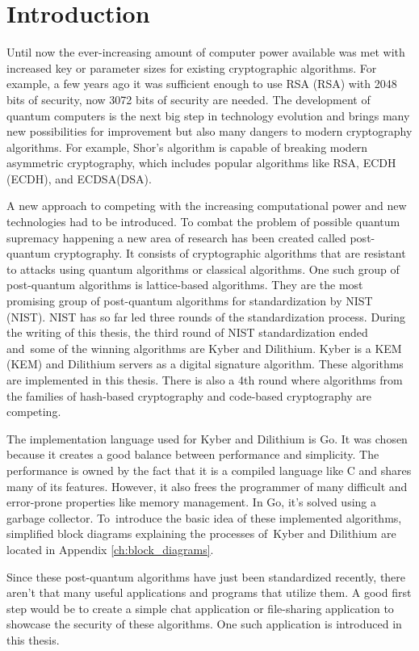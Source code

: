 \chapter*{Introduction}
{}

Until now the ever-increasing amount of computer power available was met with increased key or parameter sizes for existing cryptographic algorithms. For example, a few years ago it was sufficient enough to use RSA (\acl{RSA}) with 2048 bits of security, now 3072 bits of security are needed. The development of quantum computers is the next big step in technology evolution and brings many new possibilities for improvement but also many dangers to modern cryptography algorithms. For example, Shor's algorithm is capable of breaking modern asymmetric cryptography, which includes popular algorithms like RSA, ECDH (\acl{ECDH}), and ECDSA(\acl{DSA}).

A new approach to competing with the increasing computational power and new technologies had to be introduced. To combat the problem of possible quantum supremacy happening a new area of research has been created called post-quantum cryptography. It consists of cryptographic algorithms that are resistant to attacks using quantum algorithms or classical algorithms. One such group of post-quantum algorithms is lattice-based algorithms. They are the most promising group of post-quantum algorithms for standardization by NIST (\acl{NIST}). NIST has so far led three rounds of the standardization process. During the writing of this thesis, the third round of NIST standardization ended and~some of the winning algorithms are Kyber and Dilithium. Kyber is a KEM (\acl{KEM}) and Dilithium servers as a digital signature algorithm. These algorithms are implemented in this thesis. There is also a 4th round where algorithms from the families of hash-based cryptography and code-based cryptography are competing.

The implementation language used for Kyber and Dilithium is Go. It was chosen because it creates a good balance between performance and simplicity. The performance is owned by the fact that it is a compiled language like C and shares many of its features. However, it also frees the programmer of many difficult and error-prone properties like memory management. In Go, it's solved using a garbage collector. To~introduce the basic idea of these implemented algorithms, simplified block diagrams explaining the processes of~Kyber and Dilithium are located in Appendix \ref{ch:block_diagrams}.

Since these post-quantum algorithms have just been standardized recently, there aren't that many useful applications and programs that utilize them. A good first step would be to create a simple chat application or file-sharing application to showcase the security of these algorithms. One such application is introduced in this thesis.
